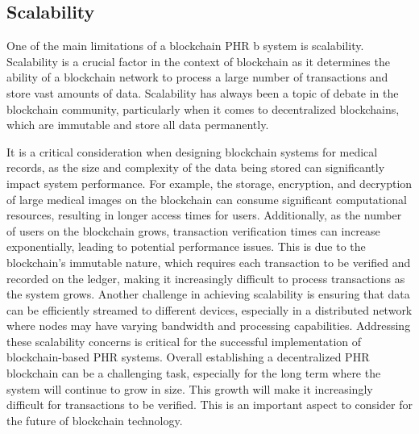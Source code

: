 \documentclass{article}
\begin{document}
\subsection{Scalability}
\label{industryanalysis:scalability}
One of the main limitations of a blockchain PHR b system is scalability. Scalability is a crucial factor in the context of blockchain as it determines the ability of a blockchain network to process a large number of transactions and store vast amounts of data. Scalability has always been a topic of debate in the blockchain community, particularly when it comes to decentralized blockchains, which are immutable and store all data permanently.

It is a critical consideration when designing blockchain systems for medical records, as the size and complexity of the data being stored can significantly impact system performance. For example, the storage, encryption, and decryption of large medical images on the blockchain can consume significant computational resources, resulting in longer access times for users. Additionally, as the number of users on the blockchain grows, transaction verification times can increase exponentially, leading to potential performance issues. This is due to the blockchain's immutable nature, which requires each transaction to be verified and recorded on the ledger, making it increasingly difficult to process transactions as the system grows. Another challenge in achieving scalability is ensuring that data can be efficiently streamed to different devices, especially in a distributed network where nodes may have varying bandwidth and processing capabilities. Addressing these scalability concerns is critical for the successful implementation of blockchain-based PHR systems. Overall establishing a decentralized PHR blockchain can be a challenging task, especially for the long term where the system will continue to grow in size. This growth will make it increasingly difficult for transactions to be verified. This is an important aspect to consider for the future of blockchain technology.
\end{document}
